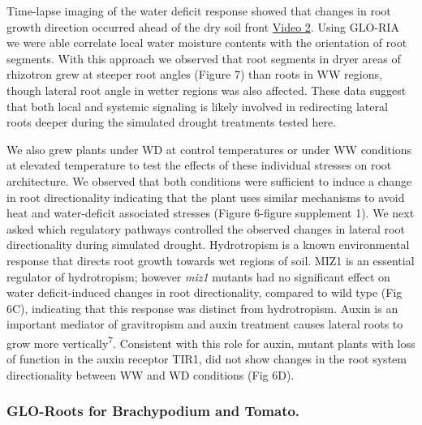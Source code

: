 \documentclass[]{article}
\begin{document}
Time-lapse imaging of the water deficit response showed that changes in
root growth direction occurred ahead of the dry soil front
\href{https://www.dropbox.com/s/x24x1uhvc8x0ou9/Video_3.avi?dl=0}{Video
2}. Using GLO-RIA we were able correlate local water moisture contents
with the orientation of root segments. With this approach we observed
that root segments in dryer areas of rhizotron grew at steeper root
angles (Figure 7) than roots in WW regions, though lateral root angle in
wetter regions was also affected. These data suggest that both local and
systemic signaling is likely involved in redirecting lateral roots
deeper during the simulated drought treatments tested here.

We also grew plants under WD at control temperatures or under WW
conditions at elevated temperature to test the effects of these
individual stresses on root architecture. We observed that both
conditions were sufficient to induce a change in root directionality
indicating that the plant uses similar mechanisms to avoid heat and
water-deficit associated stresses (Figure 6-figure supplement 1). We
next asked which regulatory pathways controlled the observed changes in
lateral root directionality during simulated drought. Hydrotropism is a
known environmental response that directs root growth towards wet
regions of soil. MIZ1 is an essential regulator of hydrotropism; however
\emph{miz1} mutants had no significant effect on water deficit-induced
changes in root directionality, compared to wild type (Fig 6C),
indicating that this response was distinct from hydrotropism. Auxin is
an important mediator of gravitropism and auxin treatment causes lateral
roots to grow more vertically\textsuperscript{7}. Consistent with this
role for auxin, mutant plants with loss of function in the auxin
receptor TIR1, did not show changes in the root system directionality
between WW and WD conditions (Fig 6D).

\subsubsection{GLO-Roots for Brachypodium and
Tomato.}\label{glo-roots-for-brachypodium-and-tomato.}
\end{document}
